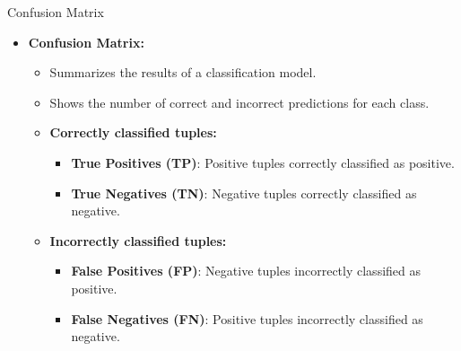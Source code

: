 \begin{frame}{Confusion Matrix}

	\vspace*{-1em}

	

	\begin{itemize}
		\item \textbf{Confusion Matrix:}
		      \begin{itemize}
			      \item Summarizes the results of a classification model.
			      \item Shows the number of correct and incorrect predictions for each class.
			      \item \textbf{\color{airforceblue}Correctly classified tuples:}
			            \begin{itemize}
				            \item \textbf{True Positives (TP)}: Positive tuples correctly classified as positive.
				            \item \textbf{True Negatives (TN)}: Negative tuples correctly classified as negative.
			            \end{itemize}
			      \item \textbf{\color{airforceblue}Incorrectly classified tuples:}
			            \begin{itemize}
				            \item \textbf{False Positives (FP)}: Negative tuples incorrectly classified as positive.
				            \item \textbf{False Negatives (FN)}: Positive tuples incorrectly classified as negative.
			            \end{itemize}
		      \end{itemize}
	\end{itemize}
\end{frame}

